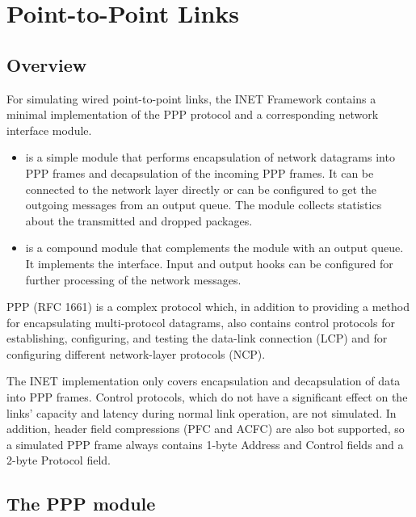 \chapter{Point-to-Point Links}
\label{cha:ppp}


\section{Overview}
\label{sec:ppp:overview}

For simulating wired point-to-point links, the INET Framework contains
a minimal implementation of the PPP protocol and a corresponding network
interface module.

\begin{itemize}
  \item {} is a simple module that performs encapsulation
    of network datagrams into PPP frames and decapsulation of
    the incoming PPP frames. It can be connected to the network
    layer directly or can be configured to get the outgoing messages
    from an output queue. The module collects statistics about
    the transmitted and dropped packages.
  \item {} is a compound module that complements
    the  module with an output queue. It implements
    the  interface. Input and output hooks
    can be configured for further processing of the network messages.
\end{itemize}

PPP (RFC 1661) is a complex protocol which, in addition to providing
a method for encapsulating multi-protocol datagrams, also contains
control protocols for establishing, configuring, and testing the data-link
connection (LCP) and for configuring different network-layer protocols (NCP).

The INET implementation only covers encapsulation and decapsulation of
data into PPP frames. Control protocols, which do not have a significant
effect on the links' capacity and latency during normal link operation,
are not simulated. In addition, header field compressions (PFC and ACFC)
are also bot supported, so a simulated PPP frame always contains 1-byte
Address and Control fields and a 2-byte Protocol field.


\section{The PPP module}
\label{sec:ppp:the-ppp-module}

